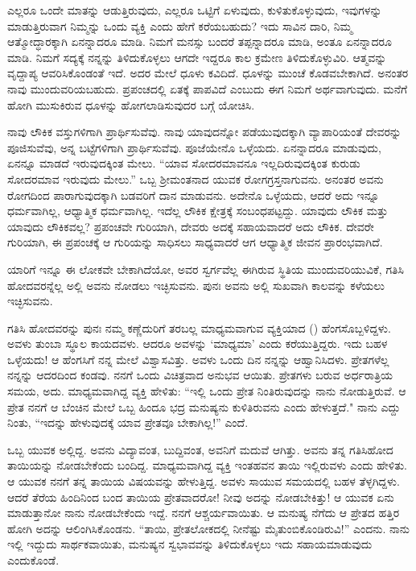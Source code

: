 ಎಲ್ಲರೂ ಒಂದೇ ಮಾತನ್ನು ಆಡುತ್ತಿರುವುದು, ಎಲ್ಲರೂ ಒಟ್ಟಿಗೆ ಏಳುವುದು, ಕುಳಿತುಕೊಳ್ಳುವುದು, ಇವುಗಳನ್ನು ಮಾಡುತ್ತಿರುವಾಗ ನಿಮ್ಮನ್ನು ಒಂದು ವ್ಯಕ್ತಿ ಎಂದು ಹೇಗೆ ಕರೆಯಬಹುದು? ಇದು ಸಾವಿನ ದಾರಿ, ನಿಮ್ಮ ಆತ್ಮೋದ್ಧಾರಕ್ಕಾಗಿ ಏನನ್ನಾದರೂ ಮಾಡಿ. ನಿಮಗೆ ಮನಸ್ಸು ಬಂದರೆ ತಪ್ಪನ್ನಾದರೂ ಮಾಡಿ, ಅಂತೂ ಏನನ್ನಾದರೂ ಮಾಡಿ. ನಿಮಗೆ ಸದ್ಯಕ್ಕೆ ನನ್ನನ್ನು ತಿಳಿದುಕೊಳ್ಳಲು ಆಗದೇ ಇದ್ದರೂ ಕಾಲ ಕ್ರಮೇಣ ತಿಳಿದುಕೊಳ್ಳುವಿರಿ. ಆತ್ಮವನ್ನು ವೃದ್ದಾಪ್ಯ ಆವರಿಸಿಕೊಂಡಂತೆ ಇದೆ. ಅದರ ಮೇಲೆ ಧೂಳು ಕವಿದಿದೆ. ಧೂಳನ್ನು ಮುಂಚೆ ಕೊಡವಬೇಕಾಗಿದೆ. ಅನಂತರ ನಾವು ಮುಂದುವರಿಯಬಹುದು. ಪ್ರಪಂಚದಲ್ಲಿ ಏತಕ್ಕೆ ಪಾಪವಿದೆ ಎಂಬುದು ಈಗ ನಿಮಗೆ ಅರ್ಥವಾಗುವುದು. ಮನೆಗೆ ಹೋಗಿ ಮುಸುಕಿರುವ ಧೂಳನ್ನು ಹೋಗಲಾಡಿಸುವುದರ ಬಗ್ಗೆ ಯೋಚಿಸಿ.

ನಾವು ಲೌಕಿಕ ವಸ್ತುಗಳಿಗಾಗಿ ಪ್ರಾರ್ಥಿಸುವೆವು. ನಾವು ಯಾವುದನ್ನೋ ಪಡೆಯುವುದಕ್ಕಾಗಿ ವ್ಯಾಪಾರಿಯಂತೆ ದೇವರನ್ನು ಪೂಜಿಸುವೆವು, ಅನ್ನ ಬಟ್ಟೆಗಳಿಗಾಗಿ ಪ್ರಾರ್ಥಿಸುವೆವು. ಪೂಜೆಯೇನೊ ಒಳ್ಳೆಯದು. ಏನನ್ನಾದರೂ ಮಾಡುವುದು, ಏನನ್ನೂ ಮಾಡದೆ ಇರುವುದಕ್ಕಿಂತ ಮೇಲು. “ಯಾವ ಸೋದರಮಾವನೂ ಇಲ್ಲದಿರುವುದಕ್ಕಿಂತ ಕುರುಡು ಸೋದರಮಾವ ಇರುವುದು ಮೇಲು.” ಒಬ್ಬ ಶ‍್ರೀಮಂತನಾದ ಯುವಕ ರೋಗಗ್ರಸ್ತನಾಗುವನು. ಅನಂತರ ಅವನು ರೋಗದಿಂದ ಪಾರಾಗುವುದಕ್ಕಾಗಿ ಬಡವರಿಗೆ ದಾನ ಮಾಡುವನು. ಅದೇನೊ ಒಳ್ಳೆಯದು, ಆದರೆ ಅದು ಇನ್ನೂ ಧರ್ಮವಾಗಿಲ್ಲ, ಆಧ್ಯಾತ್ಮಿಕ ಧರ್ಮವಾಗಿಲ್ಲ. ಇದೆಲ್ಲ ಲೌಕಿಕ ಕ್ಷೇತ್ರಕ್ಕೆ ಸಂಬಂಧಪಟ್ಟದ್ದು. ಯಾವುದು ಲೌಕಿಕ ಮತ್ತು ಯಾವುದು ಲೌಕಿಕವಲ್ಲ? ಪ್ರಪಂಚವೇ ಗುರಿಯಾಗಿ, ದೇವರು ಅದಕ್ಕೆ ಸಹಾಯವಾದರೆ ಅದು ಲೌಕಿಕ. ದೇವರೇ ಗುರಿಯಾಗಿ, ಈ ಪ್ರಪಂಚಕ್ಕೆ ಆ ಗುರಿಯನ್ನು ಸಾಧಿಸಲು ಸಾಧ್ಯವಾದರೆ ಆಗ ಆಧ್ಯಾತ್ಮಿಕ ಜೀವನ ಪ್ರಾರಂಭವಾಗಿದೆ.

ಯಾರಿಗೆ ಇನ್ನೂ ಈ ಲೋಕವೇ ಬೇಕಾಗಿದೆಯೋ, ಅವರ ಸ್ವರ್ಗವೆಲ್ಲ ಈಗಿರುವ ಸ್ಥಿತಿಯ ಮುಂದುವರಿಯುವಿಕೆ, ಗತಿಸಿ ಹೋದವರನ್ನೆಲ್ಲ ಅಲ್ಲಿ ಅವನು ನೋಡಲು ಇಚ್ಛಿಸುವನು. ಪುನಃ ಅವನು ಅಲ್ಲಿ ಸುಖವಾಗಿ ಕಾಲವನ್ನು ಕಳೆಯಲು ಇಚ್ಛಿಸುವನು.

ಗತಿಸಿ ಹೋದವರನ್ನು ಪುನಃ ನಮ್ಮ ಕಣ್ಣೆದುರಿಗೆ ತರಬಲ್ಲ ಮಾಧ್ಯಮವಾಗುವ ವ್ಯಕ್ತಿಯಾದ () ಹೆಂಗಸೊಬ್ಬಳಿದ್ದಳು. ಅವಳು ತುಂಬಾ ಸ್ಥೂಲ ಕಾಯದವಳು. ಆದರೂ ಅವಳನ್ನು `ಮಾಧ್ಯಮಾ' ಎಂದು ಕರೆಯುತ್ತಿದ್ದರು. ಇದು ಬಹಳ ಒಳ್ಳೆಯದು! ಆ ಹೆಂಗಸಿಗೆ ನನ್ನ ಮೇಲೆ ವಿಶ್ವಾಸವಿತ್ತು. ಅವಳು ಒಂದು ದಿನ ನನ್ನನ್ನು ಆಹ್ವಾನಿಸಿದಳು. ಪ್ರೇತಗಳೆಲ್ಲ ನನ್ನನ್ನು ಆದರದಿಂದ ಕಂಡವು. ನನಗೆ ಒಂದು ವಿಚಿತ್ರವಾದ ಅನುಭವ ಆಯಿತು. ಪ್ರೇತಗಳು ಬರುವ ಅರ್ಧರಾತ್ರಿಯ ಸಮಯ, ಅದು. ಮಾಧ್ಯಮವಾಗಿದ್ದ ವ್ಯಕ್ತಿ ಹೇಳಿತು: “ಇಲ್ಲಿ ಒಂದು ಪ್ರೇತ ನಿಂತಿರುವುದನ್ನು ನಾನು ನೋಡುತ್ತಿರುವೆ. ಆ ಪ್ರೇತ ನನಗೆ ಆ ಬೆಂಚಿನ ಮೇಲೆ ಒಬ್ಬ ಹಿಂದೂ ಭದ್ರ ಮನುಷ್ಯನು ಕುಳಿತಿರುವನು ಎಂದು ಹೇಳುತ್ತದೆ." ನಾನು ಎದ್ದು ನಿಂತು, “ಇದನ್ನು ಹೇಳುವುದಕ್ಕೆ ಯಾವ ಪ್ರೇತವೂ ಬೇಕಾಗಿಲ್ಲ!” ಎಂದೆ.

ಒಬ್ಬ ಯುವಕ ಅಲ್ಲಿದ್ದ. ಅವನು ವಿದ್ಯಾವಂತ, ಬುದ್ದಿವಂತ, ಅವನಿಗೆ ಮದುವೆ ಆಗಿತ್ತು. ಅವನು ತನ್ನ ಗತಿಸಿಹೋದ ತಾಯಿಯನ್ನು ನೋಡಬೇಕೆಂದು ಬಂದಿದ್ದ. ಮಾಧ್ಯಮವಾಗಿದ್ದ ವ್ಯಕ್ತಿ ಇಂತಹವನ ತಾಯಿ ಇಲ್ಲಿರುವಳು ಎಂದು ಹೇಳಿತು. ಆ ಯುವಕ ನನಗೆ ತನ್ನ ತಾಯಿಯ ವಿಷಯವನ್ನು ಹೇಳುತ್ತಿದ್ದ. ಅವಳು ಸಾಯುವ ಸಮಯದಲ್ಲಿ ಬಹಳ ತೆಳ್ಳಗಿದ್ದಳು. ಆದರೆ ತೆರೆಯ ಹಿಂದಿನಿಂದ ಬಂದ ತಾಯಿಯ ಪ್ರೇತವಾದರೋ! ನೀವು ಅದನ್ನು ನೋಡಬೇಕಿತ್ತು! ಆ ಯುವಕ ಏನು ಮಾಡುತ್ತಾನೋ ನಾನು ನೋಡಬೇಕೆಂದು ಇದ್ದೆ. ನನಗೆ ಆಶ್ಚರ್ಯವಾಯಿತು. ಆ ಮನುಷ್ಯ ನೆಗೆದು ಆ ಪ್ರೇತದ ಹತ್ತಿರ ಹೋಗಿ ಅದನ್ನು ಆಲಿಂಗಿಸಿಕೊಂಡನು. “ತಾಯಿ, ಪ್ರೇತಲೋಕದಲ್ಲಿ ನೀನೆಷ್ಟು ಮೈತುಂಬಿಕೊಂಡಿರುವಿ!” ಎಂದನು. ನಾನು ಇಲ್ಲಿ ಇದ್ದುದು ಸಾರ್ಥಕವಾಯಿತು, ಮನುಷ್ಯನ ಸ್ವಭಾವವನ್ನು ತಿಳಿದುಕೊಳ್ಳಲು ಇದು ಸಹಾಯಮಾಡುವುದು ಎಂದುಕೊಂಡೆ.

